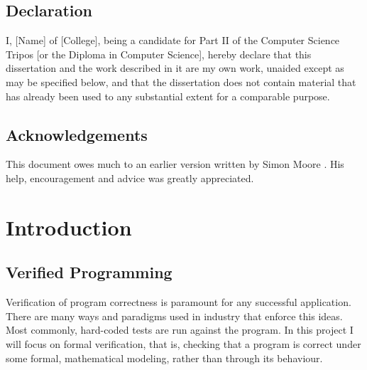 \documentclass[12pt,twoside,notitlepage]{report}
\begin{document}
\newpage
\section*{Declaration}

I, [Name] of [College], being a candidate for Part II of the Computer
Science Tripos [or the Diploma in Computer Science], hereby declare
that this dissertation and the work described in it are my own work,
unaided except as may be specified below, and that the dissertation
does not contain material that has already been used to any substantial
extent for a comparable purpose.

\bigskip
{}

\medskip
{}

\cleardoublepage

\tableofcontents

\listoffigures

\newpage
\section*{Acknowledgements}

This document owes much to an earlier version written by Simon Moore
\cite{moore95}.  His help, encouragement and advice was greatly
appreciated.


\cleardoublepage        %

\setcounter{page}{1}
\pagestyle{headings}


\chapter{Introduction}

\section{Verified Programming}

Verification of program correctness is paramount for any successful application. There are many ways and paradigms used in industry that enforce this ideas. Most commonly, hard-coded tests are run against the program. In this project I will focus on formal verification, that is, checking that a program is correct under some formal, mathematical modeling, rather than through its behaviour.
	
\end{document}
